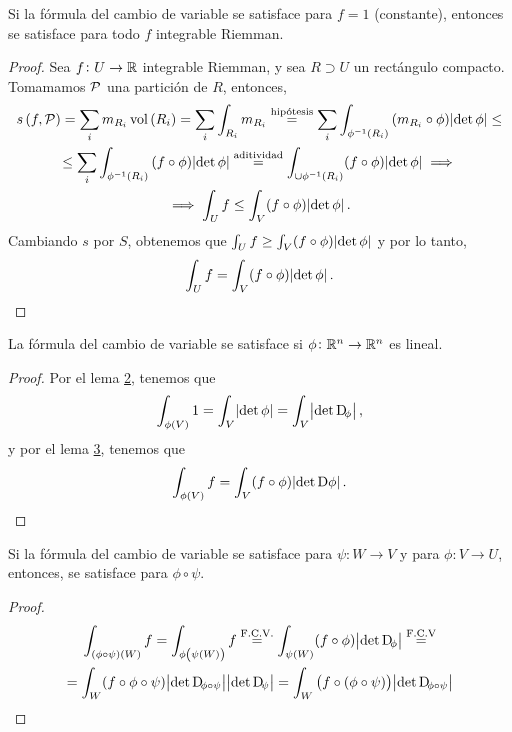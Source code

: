 \begin{lema*}[3]\label{lema:tres_cambio}
    Si la fórmula del cambio de variable se satisface para $f = 1$ (constante), entonces se satisface para todo $f$ integrable Riemman.
\end{lema*}

\begin{proof}
    Sea $f \colon U \to \mathbb{R}$ integrable Riemman, y sea $R \supset U$ un rectángulo compacto. Tomamamos $\mathcal{P}$ una partición de $R$, entonces,
    \begin{gather*}
        s\left( f, \mathcal{P} \right) = \sum_i m_{R_i} \operatorname{vol}\left( R_i \right) = \sum_{i} \int_{R_i} m_{R_i} \stackrel{\text{hipótesis}}{=}
        \sum_i \int_{\phi^{-1}\left( R_i \right)} \left( m_{R_i} \circ \phi \right)\abs{\det\phi} \leq \\ \leq
        \sum_i \int_{\phi^{-1}\left( R_i \right)} \left( f \circ \phi \right) \abs{\det\phi} \stackrel{\text{aditividad}}{=}
        \int_{\cup \phi^{-1}\left( R_i \right)} (f \circ \phi) \abs{\det \phi} \implies \\ \implies
        \int_U f \leq \int_V (f \circ \phi) \abs{\det \phi}.
    \end{gather*}
    Cambiando $s$ por $S$, obtenemos que $\int_U f \geq \int_V (f \circ \phi) \abs{\det\phi}$ y por lo tanto,
    \[
        \int_U f = \int_V (f \circ \phi) \abs{\det \phi}.
    \]
\end{proof}

\begin{lema*}[4]\label{lema:cuatro_cambio}
    La fórmula del cambio de variable se satisface si $\phi \colon \mathbb{R}^n \to \mathbb{R}^n$ es lineal.
\end{lema*}
\begin{proof}
    Por el lema \hyperref[lema:dos_cambio]{2}, tenemos que
    \[
        \int_{\phi(V)} 1 = \int_V \abs{\det \phi} = \int_V \abs{\det \Dif_\phi},
    \]
    y por el lema \hyperref[lema:tres_cambio]{3}, tenemos que
    \[
        \int_{\phi(V)} f = \int_V (f \circ \phi) \abs{\det \Dif \phi}.
    \]
\end{proof}

\begin{lema*}[5]\label{lema:cinco_cambio}
    Si la fórmula del cambio de variable se satisface para $\psi \colon W \to V$ y para $\phi \colon V \to U$, entonces, se satisface para
    $\phi \circ \psi$.
\end{lema*}

\begin{proof}
    \begin{gather*}
        \int_{(\phi \circ \psi)(W)} f = \int_{\phi\left( \psi(W) \right)} f \stackrel{\text{F.C.V.}}{=} \int_{\psi(W)} (f \circ \phi)
        \abs{\det \Dif_\phi} \stackrel{\text{F.C.V}}{=} \\ = \int_W (f \circ \phi \circ \psi) \abs{\det \Dif_{\phi \circ \psi}} \abs{\det \Dif_\psi} =
        \int_W \left( f \circ ( \phi \circ \psi) \right) \abs{\det \Dif_{\phi \circ \psi}}
    \end{gather*}
\end{proof}

